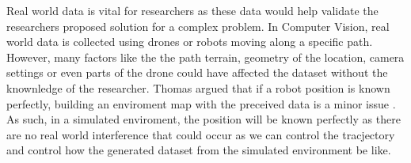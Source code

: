 Real world data is vital for researchers as these data would help validate the researchers proposed solution for a complex problem. In Computer Vision, real world data is collected using drones or robots moving along a specific path. However, many factors like the the path terrain, geometry of the location, camera settings or even parts of the drone could have affected the dataset without the knownledge of the researcher. Thomas argued that if a robot position is known perfectly, building an enviroment map with the preceived data is a minor issue \cite{lemaire2007vision}. As such, in a simulated enviroment, the position will be known perfectly as there are no real world interference that could occur as we can control the tracjectory and control how the generated dataset from the simulated environment be like.